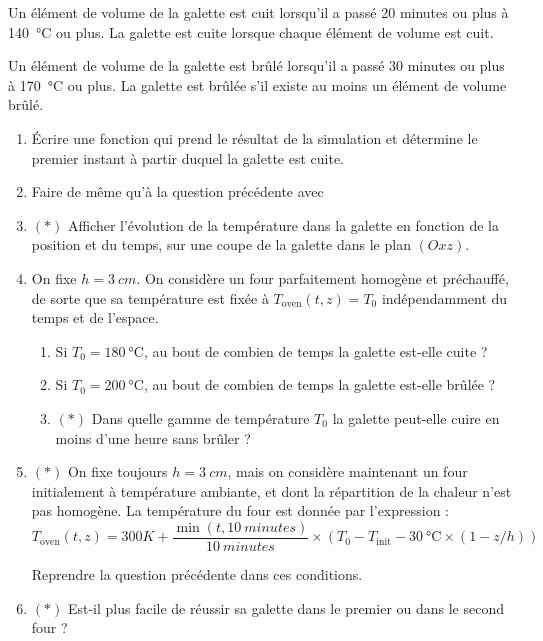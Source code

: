 \documentclass{article}
\newcommand{\paren}[1]{\ensuremath{\left(#1\right)}}
\begin{document}
Un élément de volume de la galette est cuit lorsqu'il a passé 20 minutes ou plus à \qty{140}{\degreeCelsius} ou plus. La galette est cuite lorsque chaque élément de volume est cuit.

Un élément de volume de la galette est brûlé lorsqu'il a passé 30 minutes ou plus à \qty{170}{\degreeCelsius} ou plus. La galette est brûlée s'il existe au moins un élément de volume brûlé.

\begin{enumerate}[resume]
	\item Écrire une fonction  qui prend le résultat de la simulation et détermine le premier instant à partir duquel la galette est cuite.
	
	\item Faire de même qu'à la question précédente avec 

	\item $(*)$ Afficher l'évolution de la température dans la galette en fonction de la position et du temps, sur une coupe de la galette dans le plan $(Oxz)$.

	\item On fixe $h = \qty{3}{cm}$. On considère un four parfaitement homogène et préchauffé, de sorte que sa température est fixée à $T_{\text{oven}}(t, z) = T_0$ indépendamment du temps et de l'espace.
	\begin{enumerate}
		\item Si $T_0 = \qty{180}{\degreeCelsius}$, au bout de combien de temps la galette est-elle cuite ?
		\item Si $T_0 = \qty{200}{\degreeCelsius}$, au bout de combien de temps la galette est-elle brûlée ?
		\item $(*)$ Dans quelle gamme de température $T_0$ la galette peut-elle cuire en moins d'une heure sans brûler ?
	\end{enumerate}

	\item $(*)$ On fixe toujours $h = \qty{3}{cm}$, mais on considère maintenant un four initialement à température ambiante, et dont la répartition de la chaleur n'est pas homogène. La température du four est donnée par l'expression :
	\[T_{\text{oven}}(t, z) = \qty{300}K + \frac{\min(t, \qty{10}{minutes})}{\qty{10}{minutes}}\times\paren{T_0 - T_{\text{init}} - \qty{30}{\degreeCelsius}\times(1 - z/h)}\]
	
	Reprendre la question précédente dans ces conditions.
	
	\item $(*)$ Est-il plus facile de réussir sa galette dans le premier ou dans le second four ?
	

\end{enumerate}
\end{document}
